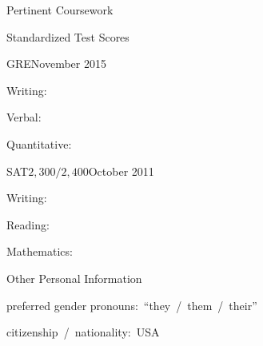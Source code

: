 \documentclass{resume}
\begin{document}
{\begin{rSection}{Pertinent Coursework}
  \end{rSection}





  \begin{rSection}{Standardized Test Scores}

  \begin{rSubSection}{GRE}{November 2015}{}{}
  \item Writing:~\tab\tab{}\tab{}
  \item Verbal:~\tab\tab{}\tab{}
  \item Quantitative:~\tab{}\tab{}
  \end{rSubSection}

  \begin{rSubSection}{SAT\hspace{7.85em}$2,300/2,400$}{October 2011}{}{}
  \item Writing:~\tab\tab{}\tab{}
  \item Reading:~\tab\tab{}\tab{}
  \item Mathematics:~\tab{}\tab{}
  \end{rSubSection}

  \end{rSection}





\begin{rSection}{Other Personal Information}

preferred gender pronouns:~``they~/~them~/~their''

citizenship~/~nationality:~USA

\end{rSection}

}{}
\end{document}
